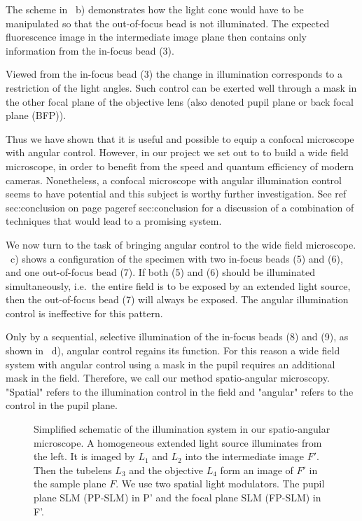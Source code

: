 The scheme in ~b) demonstrates how
the light cone would have to be manipulated so that the out-of-focus
bead is not illuminated. The expected fluorescence image in the
intermediate image plane then contains only information from the
in-focus bead (3).

Viewed from the in-focus bead (3) the change in illumination
corresponds to a restriction of the light angles. Such control can be
exerted well through a mask in the other focal plane of the objective
lens (also denoted pupil plane or back focal plane (BFP)).

Thus we have shown that it is useful and possible to equip a confocal
microscope with angular control. However, in our project we set out to
to build a wide field microscope, in order to benefit from the speed
and quantum efficiency of modern cameras.  Nonetheless, a confocal
microscope with angular illumination control seems to have potential
and this subject is worthy further investigation.  See ref
sec:conclusion on page pageref sec:conclusion for a discussion of a
combination of techniques that would lead to a promising system.

We now turn to the task of bringing angular control to the wide field
microscope. ~c) shows a configuration of the
specimen with two in-focus beads (5) and (6), and one out-of-focus
bead (7).  If both (5) and (6) should be illuminated simultaneously,
i.e.\ the entire field is to be exposed by an extended light source,
then the out-of-focus bead (7) will always be exposed. The angular
illumination control is ineffective for this pattern.

Only by a sequential, selective illumination of the in-focus beads (8)
and (9), as shown in ~d), angular control
regains its function. For this reason a wide field system with angular
control using a mask in the pupil requires an additional mask in the
field.  Therefore, we call our method spatio-angular
microscopy. "Spatial" refers to the illumination control in the field
and "angular" refers to the control in the pupil plane.


\begin{figure}[!hbt]
  \centering
  \caption{Simplified schematic of the illumination system in our
    spatio-angular microscope. A homogeneous extended light source
    illuminates from the left. It is imaged by $L_1$ and $L_2$ into
    the intermediate image $F'$. Then the tubelens $L_3$ and the
    objective $L_4$ form an image of $F'$ in the sample plane $F$. We
    use two spatial light modulators. The pupil plane SLM (PP-SLM) in
    P' and the focal plane SLM (FP-SLM) in F'.}
  \label{fig:memi-simple}
\end{figure}

